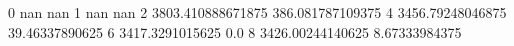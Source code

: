 0 nan nan
1 nan nan
2 3803.410888671875 386.081787109375
4 3456.79248046875 39.46337890625
6 3417.3291015625 0.0
8 3426.00244140625 8.67333984375
